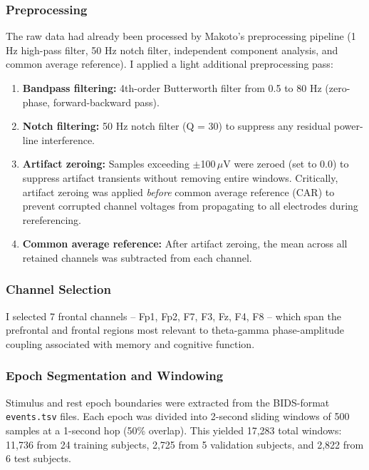 \documentclass[11pt,letterpaper]{article}
\begin{document}
\subsubsection{Preprocessing}

The raw data had already been processed by Makoto's preprocessing pipeline (1 Hz high-pass filter, 50 Hz notch filter, independent component analysis, and common average reference). I applied a light additional preprocessing pass:

\begin{enumerate}[nosep]
  \item \textbf{Bandpass filtering:} 4th-order Butterworth filter from 0.5 to 80 Hz (zero-phase, forward-backward pass).
  \item \textbf{Notch filtering:} 50 Hz notch filter (Q = 30) to suppress any residual power-line interference.
  \item \textbf{Artifact zeroing:} Samples exceeding $\pm$100\,$\mu$V were zeroed (set to 0.0) to suppress artifact transients without removing entire windows. Critically, artifact zeroing was applied \textit{before} common average reference (CAR) to prevent corrupted channel voltages from propagating to all electrodes during rereferencing.
  \item \textbf{Common average reference:} After artifact zeroing, the mean across all retained channels was subtracted from each channel.
\end{enumerate}

\subsubsection{Channel Selection}

I selected 7 frontal channels -- Fp1, Fp2, F7, F3, Fz, F4, F8 -- which span the prefrontal and frontal regions most relevant to theta-gamma phase-amplitude coupling associated with memory and cognitive function.

\subsubsection{Epoch Segmentation and Windowing}

Stimulus and rest epoch boundaries were extracted from the BIDS-format \texttt{events.tsv} files. Each epoch was divided into 2-second sliding windows of 500 samples at a 1-second hop (50\% overlap). This yielded 17,283 total windows: 11,736 from 24 training subjects, 2,725 from 5 validation subjects, and 2,822 from 6 test subjects.
\end{document}
